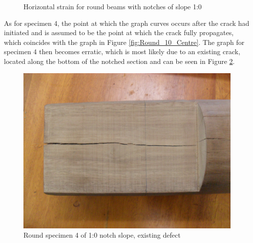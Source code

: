 \documentclass[11pt,a4paper]{article}
\numberwithin{equation}{subsection}
\begin{document}
\vspace*{\baselineskip}
\begin{figure}[h]
	\begin{center}
	\end{center}
	\caption{Horizontal strain for round beams with notches of slope 1:0}
	\label{fig:Round_10_Z}
\end{figure}
\pagebreak

\noindent
As for specimen 4, the point at which the graph curves occurs after the crack had initiated and is assumed to be the point at which the crack fully propagates, which coincides with the graph in Figure \ref{fig:Round_10_Centre}. The graph for specimen 4 then becomes erratic, which is most likely due to an existing crack, located along the bottom of the notched section and can be seen in Figure \ref{fig:Spec_4}.

\vspace*{\baselineskip}

\begin{figure}[h]
	\begin{center}
		\includegraphics[scale=0.09]{Spec_4}
	\end{center}
	\caption{Round specimen 4 of 1:0 notch slope, existing defect}
	\label{fig:Spec_4}
\end{figure}
\end{document}
